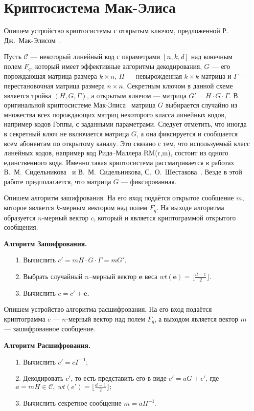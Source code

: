 
\section{Криптосистема Мак-Элиса}
Опишем устройство криптосистемы с открытым ключом, предложенной Р.~
Дж.~Мак-Элисом~\cite{MCEliece}.

Пусть $\mathcal C$ --- некоторый линейный код с параметрами
$[n,k,d]$ над конечным полем $F_q$, который имеет эффективные
алгоритмы декодирования, $G$ --- его порождающая матрица размера
$k\times n$, $H$ --- невырожденная $k\times k$ матрица и $\Gamma$
--- перестановочная матрица размера $n\times n$. Секретным ключом
в данной схеме является тройка $(H,G,\Gamma)$, а открытым ключом
--- матрица $G'=H\cdot G\cdot \Gamma$. В оригинальной
криптосистеме Мак-Элиса~\cite{MCEliece} матрица $G$ выбирается
случайно из множества всех порождающих матриц некоторого класса
линейных кодов, например кодов Гоппы, с заданными параметрами.
Следует отметить, что иногда в секретный ключ не включается
матрица $G$, а она фиксируется и сообщается всем абонентам по
открытому каналу. Это связано с тем, что используемый класс
линейных кодов, например код Рида--Маллера RM(r,m), состоит из
одного единственного кода. Именно такая криптосистема
рассматривается в работах В.~М.~Сидельникова~\cite{Sidelnikov1} и
В.~М.~Сидельникова, С.~О.~Шестакова~\cite{Sidelnikov3}. Везде в
этой работе предполагается, что матрица $G$ --- фиксированная.

Опишем алгоритм зашифрования. На его вход подаётся открытое
сообщение $m$, которое является $k$-мерным вектором над полем
$F_q$. На выходе алгоритма образуется $n$-мерный вектор $c$,
который и является криптограммой открытого сообщения.

\textbf{Алгоритм Зашифрования.}
\begin{itemize}
\item[1.] Вычислить $c'=mH\cdot G\cdot \Gamma=mG'$.
\item[2.] Выбрать случайный $n$--мерный вектор $\mathbf e$ веса $wt(\mathbf e)=\lfloor\frac{d-1}2\rfloor$.
\item[3.] Вычислить $c=c'+\mathbf e$.
\end{itemize}

Опишем устройство алгоритма расшифрования. На его вход подаётся
криптограмма $c$
--- $n$-мерный вектор над полем $F_q$, а выходом является вектор $m$
--- зашифрованное сообщение.

\textbf{Алгоритм Расшифрования.}
\begin{itemize}
\item[1.] Вычислить $c'=c\Gamma^{-1}$;
\item[2.] Декодировать $c'$, то есть
представить его в виде $c'=aG+e'$, где $a=mH\in\mathcal
C,\;wt(e')=\lfloor\frac{d-1}2\rfloor;$
\item[3.] Вычислить секретное сообщение $m=aH^{-1}$.
\end{itemize}


